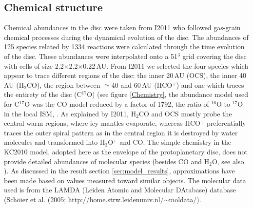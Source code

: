 \documentclass[useAMS,usenatbib]{mn2e}
\begin{document}
\subsection{Chemical structure} \label{subsec:chemical_structure}
Chemical abundances in the disc were taken from I2011 who followed gas-grain chemical processes during the dynamical evolution of the disc. The abundances of 125 species related by 1334 reactions were calculated through the time evolution of the disc. These abundances were interpolated onto a 51$^3$ grid covering the disc with cells of size 2.2$\times$2.2$\times$0.22$\,$AU.  From I2011 we selected the four species which appear to trace different regions of the disc: the inner 20\,AU (OCS), the inner 40\,AU (H$_2$CO),  the region between $\simeq$40 and 60\,AU (HCO$^+$) and one which traces the entirety of the disc (C$^{17}$O) (see figure \ref{Chemistry}, the abundance model used for C$^{17}$O was the CO model reduced by a factor of 1792, the ratio of $^{16}$O to $^{17}$O in the local ISM, \citet{Wilson1994}. As explained by I2011,  H$_2$CO and OCS mostly probe the central warm regions, where icy mantles evaporate, whereas HCO$^+$ preferentially traces the outer spiral pattern as in the central region it is destroyed by water molecules and transformed into H$_3$O$^+$ and CO. The simple chemistry in the KC2010 model, adopted here as the envelope of the protoplanetary disc, does not provide detailed abundances of molecular species (besides CO and H$_2$O, see also \cite{Caselli2012}). As discussed in the result section \ref{sec:model_results}, approximations have been made based on values measured toward similar objects. The molecular data used is from the LAMDA (Leiden Atomic and Molecular DAtabase) database (Sch\"oier et al. (2005; http://home.strw.leidenuniv.nl/$\sim$moldata/).
\end{document}
